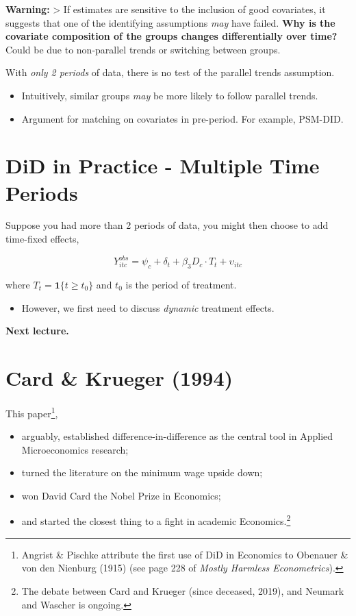 \documentclass[
  letterpaper,
  DIV=11,
  numbers=noendperiod]{scrreprt}
\providecommand{\tightlist}{%
  \setlength{\itemsep}{0pt}\setlength{\parskip}{0pt}}\usepackage{longtable,booktabs,array}
\theoremstyle{definition}
\theoremstyle{remark}
\begin{document}
\begin{enumerate}
  \textbf{Warning:} \textgreater{} If estimates are sensitive to the
  inclusion of good covariates, it suggests that one of the identifying
  assumptions \emph{may} have failed. \textbf{Why is the covariate
  composition of the groups changes differentially over time?} Could be
  due to non-parallel trends or switching between groups.

  With \emph{only 2 periods} of data, there is no test of the parallel
  trends assumption.

  \begin{itemize}
  \tightlist
  \item
    Intuitively, similar groups \emph{may} be more likely to follow
    parallel trends.
  \item
    Argument for matching on covariates in pre-period. For example,
    PSM-DID.
  \end{itemize}

  \section{DiD in Practice - Multiple Time
  Periods}\label{did-in-practice---multiple-time-periods}

  Suppose you had more than 2 periods of data, you might then choose to
  add time-fixed effects,

  \[
  Y^{obs}_{itc} = \psi_c + \delta_t + \beta_3 D_c\cdot T_t + \upsilon_{itc}
  \]

  where \(T_t=\mathbf{1}\{t\geq t_0\}\) and \(t_0\) is the period of
  treatment.

  \begin{itemize}
  \tightlist
  \item
    However, we first need to discuss \emph{dynamic} treatment effects.
  \end{itemize}

  \textbf{Next lecture.}

  \section{Card \& Krueger (1994)}\label{card-krueger-1994}

  This paper\footnote{Angrist \& Pischke attribute the first use of DiD
    in Economics to Obenauer \& von den Nienburg (1915) (see page 228 of
    \emph{Mostly Harmless Econometrics}).},

  \begin{itemize}
  \item
    arguably, established difference-in-difference as the central tool
    in Applied Microeconomics research;
  \item
    turned the literature on the minimum wage upside down;
  \item
    won David Card the Nobel Prize in Economics;
  \item
    and started the closest thing to a fight in academic
    Economics.\footnote{The debate between Card and Krueger (since
      deceased, 2019), and Neumark and Wascher is ongoing.}
  \end{itemize}


\end{enumerate}
\end{document}
